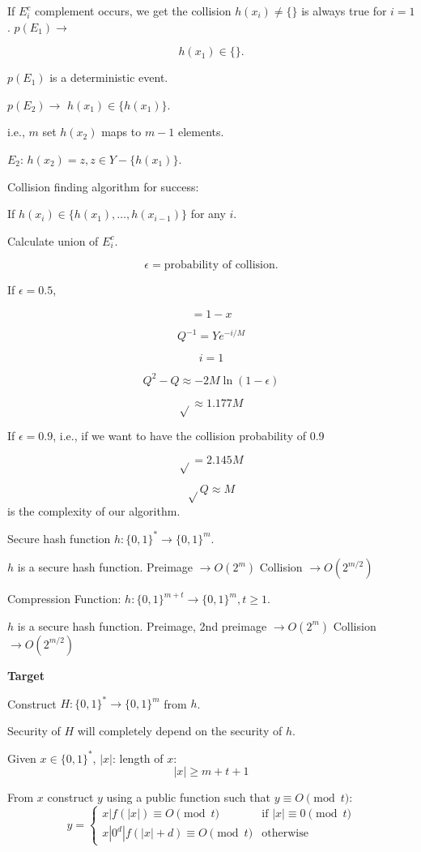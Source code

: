 \documentclass[11pt]{article}
\begin{document}
If \( E_i^c \) complement occurs, we get the collision \( h(x_i) \neq \{\} \) is always true for \( i = 1 \). \( p(E_1) \rightarrow \)

\[ h(x_1) \in \{\}. \]

\( p(E_1) \) is a deterministic event.

\( p(E_2) \rightarrow \) \( h(x_1) \in \{h(x_1)\} \).

i.e., \( m \) set \( h(x_2) \) maps to \( m - 1 \) elements.

\( E_2 \): \( h(x_2) = z, z \in Y - \{h(x_1)\} \).

Collision finding algorithm for success:

If \( h(x_i) \in \{h(x_1), \ldots, h(x_{i-1})\} \) for any \( i \).

Calculate union of \( E_i^c \).

\[ \epsilon = \text{probability of collision}. \]

If \( \epsilon = 0.5 \),

\[ = 1 - x \]

\[ Q^{-1} = Y e^{-i/M} \]

\[ i=1 \]

\[ Q^2 - Q \approx -2M \ln(1 - \epsilon) \]

\[ \sqrt{} \approx 1.177 M \]

If \( \epsilon = 0.9 \), i.e., if we want to have the collision probability of 0.9

\[ \sqrt{} = 2.145 M \]

\[ \sqrt{} Q \approx M \] is the complexity of our algorithm.

Secure hash function \( h: \{0,1\}^* \rightarrow \{0,1\}^m \).

\( h \) is a secure hash function.
Preimage \(\rightarrow O(2^m)\)
Collision \(\rightarrow O(2^{m/2})\)

Compression Function: \( h: \{0,1\}^{m+t} \rightarrow \{0,1\}^m, t \geq 1 \).

\( h \) is a secure hash function.
Preimage, 2nd preimage \(\rightarrow O(2^m)\)
Collision \(\rightarrow O(2^{m/2})\)

\textbf{Target}

Construct $H : \{0, 1\}^* \to \{0, 1\}^m$ from $h$.

Security of $H$ will completely depend on the security of $h$.

Given $x \in \{0, 1\}^*$, $|x|$: length of $x$:
\[
|x| \geq m + t + 1
\]

From $x$ construct $y$ using a public function such that $y \equiv O \pmod{t}$:
\[
y =
\begin{cases}
    x | f(|x|) \equiv O \pmod{t} & \text{if } |x| \equiv 0 \pmod{t} \\
    x | 0^d | f(|x|+d) \equiv O \pmod{t} & \text{otherwise}
\end{cases}
\]
\end{document}
